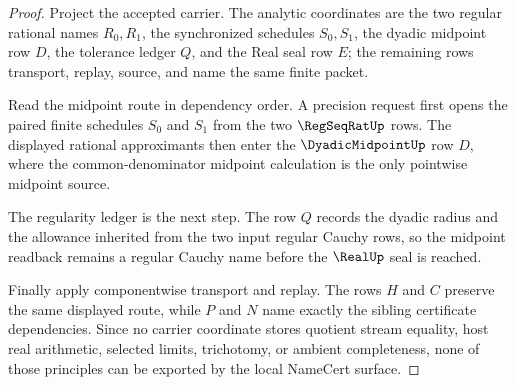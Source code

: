 \begin{proof}
Project the accepted carrier. The analytic coordinates are the two regular rational names $R_0,R_1$, the synchronized schedules $S_0,S_1$, the dyadic midpoint row $D$, the tolerance ledger $Q$, and the Real seal row $E$; the remaining rows transport, replay, source, and name the same finite packet.

Read the midpoint route in dependency order. A precision request first opens the paired finite schedules $S_0$ and $S_1$ from the two $\RegSeqRatUp$ rows. The displayed rational approximants then enter the $\DyadicMidpointUp$ row $D$, where the common-denominator midpoint calculation is the only pointwise midpoint source.

The regularity ledger is the next step. The row $Q$ records the dyadic radius and the allowance inherited from the two input regular Cauchy rows, so the midpoint readback remains a regular Cauchy name before the $\RealUp$ seal is reached.

Finally apply componentwise transport and replay. The rows $H$ and $C$ preserve the same displayed route, while $P$ and $N$ name exactly the sibling certificate dependencies. Since no carrier coordinate stores quotient stream equality, host real arithmetic, selected limits, trichotomy, or ambient completeness, none of those principles can be exported by the local NameCert surface.
\end{proof}

